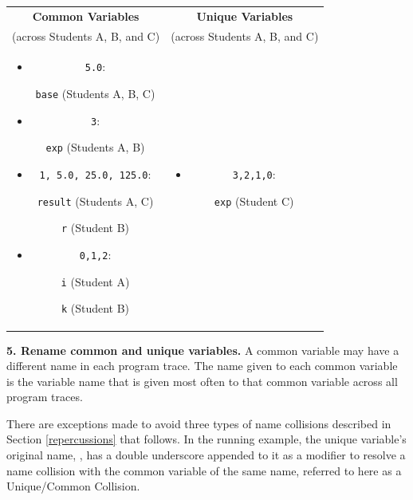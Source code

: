\begin{tabular}{cc}
{\bf Common Variables} & {\bf  Unique Variables} \\
(across Students A, B, and C) & (across Students A, B, and C) \\
\begin{minipage}{0.5\linewidth}
\begin{itemize}
\item \texttt{5.0}:

\texttt{base} (Students A, B, C)
\item \texttt{3}:

\texttt{exp} (Students A, B) 
\item \texttt{1, 5.0, 25.0, 125.0}: 

\texttt{result} (Students A, C)

\texttt{r} (Student B)
\item \texttt{0,1,2}:

\texttt{i} (Student A) 

\texttt{k} (Student B)
\end{itemize}
\end{minipage}
&
\begin{minipage}{0.5\linewidth}
\begin{itemize}
\item \texttt{3,2,1,0}:

\texttt{exp} (Student C)
\end{itemize}
\end{minipage} \\
\end{tabular}

{\bf 5. Rename common and unique variables.} A common variable may have a different name in each program trace. The name given to each common variable is the variable name that is given most often to that common variable across all program traces. 

There are exceptions made to avoid three types of name collisions described in Section \ref{repercussions} that follows. In the running example, the unique variable's original name, , has a double underscore appended to it as a modifier to resolve a name collision with the common variable of the same name, referred to here as a Unique/Common Collision.

